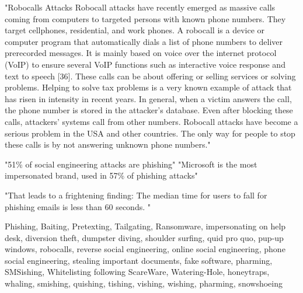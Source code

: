 "Robocalls Attacks
Robocall attacks have recently emerged as massive calls coming from computers to targeted persons with known phone numbers. They target cellphones, residential,
and work phones. A robocall is a device or computer program that automatically dials a list of phone numbers to deliver prerecorded messages. It is mainly based on
voice over the internet protocol (VoIP) to ensure several VoIP functions such as interactive voice response and text to speech [36]. These calls can be about offering
or selling services or solving problems. Helping to solve tax problems is a very known example of attack that has risen in intensity in recent years. In general, when
a victim answers the call, the phone number is stored in the attacker’s database. Even after blocking these calls, attackers’ systems call from other numbers. Robocall
attacks have become a serious problem in the USA and other countries. The only way for people to stop these calls is by not answering unknown phone numbers."\cite{4_mdpi}

"51\% of social engineering attacks are phishing"\cite{3_barracuda}
"Microsoft is the most impersonated brand, used in 57\% of phishing attacks"\cite{3_barracuda}

"That leads to a frightening
finding: The median time for
users to fall for phishing emails
is less than 60 seconds. "\cite{verizon2024}

Phishing, Baiting, Pretexting, Tailgating, Ransomware, impersonating on help desk, diversion theft, dumpster diving,
shoulder surfing, quid pro quo, pup-up windows, robocalls, reverse social engineering, online social engineering, phone social engineering,
stealing important documents, fake software, pharming, SMSishing, Whitelisting following
ScareWare, Watering-Hole, honeytraps, whaling, smishing, quishing, tishing, vishing, wishing, pharming, snowshoeing


